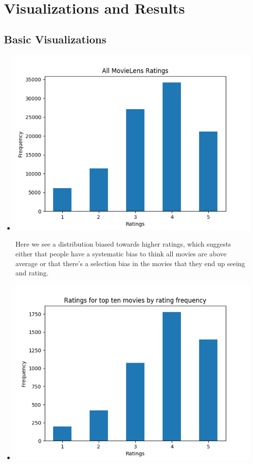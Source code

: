\section{Visualizations and Results}
\medskip
\subsection{Basic Visualizations}
\begin{itemize}
    \item {}

        \includegraphics{basics_all.png}

        Here we see a distribution biased towards higher ratings, which suggests either that people have a systematic bias to think all movies are above average or that there's a selection bias in the movies that they end up seeing and rating.

    \item {}

        \includegraphics{basics_top_ten_frequency.png}


\end{itemize}

